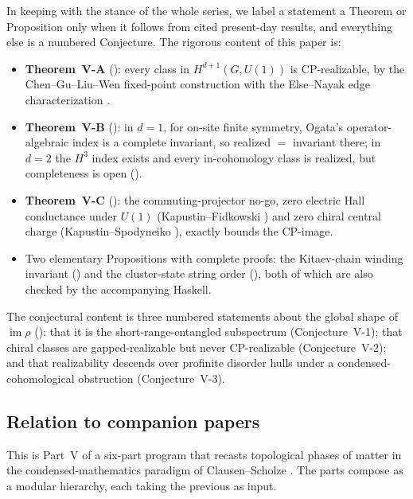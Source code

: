 \documentclass[12pt]{article}
\newcommand{\real}{\rho}                         %
\newcommand{\CP}{\mathrm{CP}}                    %
\newcommand{\im}{\operatorname{im}}
\theoremstyle{definition}
\theoremstyle{remark}
\begin{document}
In keeping with the stance of the whole series, we label a statement a Theorem or
Proposition only when it follows from cited present-day results, and everything else is a
numbered Conjecture. The rigorous content of this paper is:
\begin{itemize}
  \item \textbf{Theorem~V-A} (): every class in $H^{d+1}(G,U(1))$ is
        $\CP$-realizable, by the Chen--Gu--Liu--Wen fixed-point construction
        \cite{cglw-cohomology} with the Else--Nayak edge characterization \cite{else-nayak}.
  \item \textbf{Theorem~V-B} (): in $d=1$, for on-site finite symmetry, Ogata's
        operator-algebraic index \cite{ogata-spt-chains,ogata-classification-review} is a
        complete invariant, so realized $=$ invariant there; in $d=2$ the $H^3$ index exists
        \cite{ogata-h3-index} and every in-cohomology class is realized, but completeness is
        open ().
  \item \textbf{Theorem~V-C} (): the commuting-projector no-go, zero electric
        Hall conductance under $U(1)$ (Kapustin--Fidkowski \cite{kapustin-fidkowski}) and zero
        chiral central charge (Kapustin--Spodyneiko \cite{kapustin-spodyneiko-thermal}),
        exactly bounds the $\CP$-image.
  \item Two elementary Propositions with complete proofs: the Kitaev-chain winding invariant
        () and the cluster-state string order (), both
        of which are also checked by the accompanying Haskell.
\end{itemize}
The conjectural content is three numbered statements about the global shape of $\im\real$
(): that it is the short-range-entangled subspectrum (Conjecture~V-1); that
chiral classes are gapped-realizable but never $\CP$-realizable (Conjecture~V-2); and that
realizability descends over profinite disorder hulls under a condensed-cohomological
obstruction (Conjecture~V-3).

\subsection{Relation to companion papers}
\label{sec:companions}

This is Part~V of a six-part program that recasts topological phases of matter in the
condensed-mathematics paradigm of Clausen--Scholze \cite{clausen-scholze-condensed}. The
parts compose as a modular hierarchy, each taking the previous as input.
\end{document}
